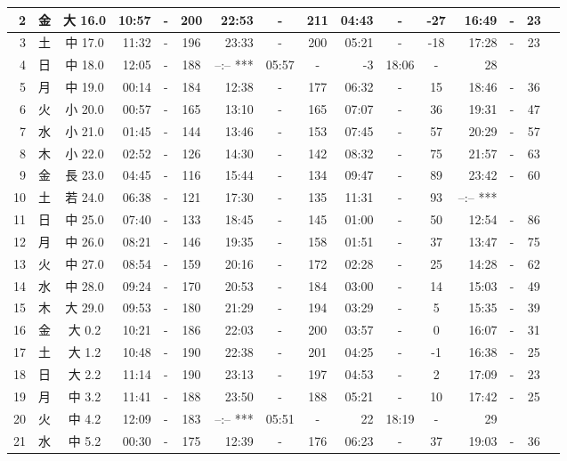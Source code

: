 \documentclass[12pt.a4j]{jsarticle}
\begin{document}
\begin{center}
\begin{table}[ht]
\begin{tabular}{|rc|cr|ccrccr|ccrccr|}
\hline
 2 & 金 & 大 16.0 & 10:57 &-& 200 & 22:53 &-& 211 & 04:43 &-& -27 & 16:49 &-&  23 \\
\hline
 3 & 土 & 中 17.0 & 11:32 &-& 196 & 23:33 &-& 200 & 05:21 &-& -18 & 17:28 &-&  23 \\
\hline
 4 & 日 & 中 18.0 & 12:05 &-& 188 & --:--   *** & 05:57 &-&  -3 & 18:06 &-&  28 \\
\hline
 5 & 月 & 中 19.0 & 00:14 &-& 184 & 12:38 &-& 177 & 06:32 &-&  15 & 18:46 &-&  36 \\
\hline
 6 & 火 & 小 20.0 & 00:57 &-& 165 & 13:10 &-& 165 & 07:07 &-&  36 & 19:31 &-&  47 \\
\hline
 7 & 水 & 小 21.0 & 01:45 &-& 144 & 13:46 &-& 153 & 07:45 &-&  57 & 20:29 &-&  57 \\
\hline
 8 & 木 & 小 22.0 & 02:52 &-& 126 & 14:30 &-& 142 & 08:32 &-&  75 & 21:57 &-&  63 \\
\hline
 9 & 金 & 長 23.0 & 04:45 &-& 116 & 15:44 &-& 134 & 09:47 &-&  89 & 23:42 &-&  60 \\
\hline
10 & 土 & 若 24.0 & 06:38 &-& 121 & 17:30 &-& 135 & 11:31 &-&  93 & --:--   *** \\
\hline
11 & 日 & 中 25.0 & 07:40 &-& 133 & 18:45 &-& 145 & 01:00 &-&  50 & 12:54 &-&  86 \\
\hline
12 & 月 & 中 26.0 & 08:21 &-& 146 & 19:35 &-& 158 & 01:51 &-&  37 & 13:47 &-&  75 \\
\hline
13 & 火 & 中 27.0 & 08:54 &-& 159 & 20:16 &-& 172 & 02:28 &-&  25 & 14:28 &-&  62 \\
\hline
14 & 水 & 中 28.0 & 09:24 &-& 170 & 20:53 &-& 184 & 03:00 &-&  14 & 15:03 &-&  49 \\
\hline
15 & 木 & 大 29.0 & 09:53 &-& 180 & 21:29 &-& 194 & 03:29 &-&   5 & 15:35 &-&  39 \\
\hline
16 & 金 & 大  0.2 & 10:21 &-& 186 & 22:03 &-& 200 & 03:57 &-&   0 & 16:07 &-&  31 \\
\hline
17 & 土 & 大  1.2 & 10:48 &-& 190 & 22:38 &-& 201 & 04:25 &-&  -1 & 16:38 &-&  25 \\
\hline
18 & 日 & 大  2.2 & 11:14 &-& 190 & 23:13 &-& 197 & 04:53 &-&   2 & 17:09 &-&  23 \\
\hline
19 & 月 & 中  3.2 & 11:41 &-& 188 & 23:50 &-& 188 & 05:21 &-&  10 & 17:42 &-&  25 \\
\hline
20 & 火 & 中  4.2 & 12:09 &-& 183 & --:--   *** & 05:51 &-&  22 & 18:19 &-&  29 \\
\hline
21 & 水 & 中  5.2 & 00:30 &-& 175 & 12:39 &-& 176 & 06:23 &-&  37 & 19:03 &-&  36 \\

\end{tabular}
\end{table}
\end{center}
\end{document}
